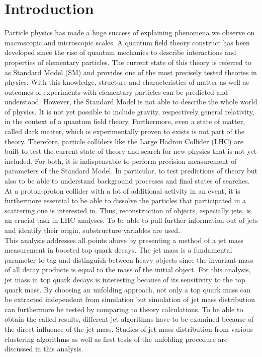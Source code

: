 \chapter{Introduction}
	Particle physics has made a huge success of explaining phenomena we observe on macroscopic and microscopic scales. A quantum field theory construct has been developed since the rise of quantum mechanics to describe interactions and properties of elementary particles. The current state of this theory is referred to as Standard Model (SM) and provides one of the most precisely tested theories in physics. With this knowledge, structure and characteristics of matter as well as outcomes of experiments with elementary particles can be predicted and understood. However, the Standard Model is not able to describe the whole world of physics. It is not yet possible to include gravity, respectively general relativity, in the context of a quantum field theory. Furthermore, even a state of matter, called dark matter, which is experimentally proven to exists is not part of the theory. Therefore, particle colliders like the Large Hadron Collider (LHC) are built to test the current state of theory and search for new physics that is not yet included. For both, it is indispensable to perform precision measurement of parameters of the Standard Model. In particular, to test predictions of theory but also to be able to understand background processes and final states of searches. At a proton-proton collider with a lot of additional activity in an event, it is furthermore essential to be able to dissolve the particles that participated in a scattering one is interested in. Thus, reconstruction of objects, especially jets, is an crucial task in LHC analyses. To be able to pull further information out of jets and identify their origin, substructure variables are used. \\
	This analysis addresses all points above by presenting a method of a jet mass measurement in boosted top quark decays. The jet mass is a fundamental parameter to tag and distinguish between heavy objects since the invariant mass of all decay products is equal to the mass of the initial object. For this analysis, jet mass in top quark decays is interesting because of its sensitivity to the top quark mass. By choosing an unfolding approach, not only a top quark mass can be extracted independent from simulation but simulation of jet mass distribution can furthermore be tested by comparing to theory calculations. To be able to obtain the called results, different jet algorithms have to be examined because of the direct influence of the jet mass. Studies of jet mass distribution from various clustering algorithms as well as first tests of the unfolding procedure are discussed in this analysis.
